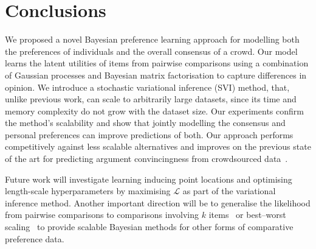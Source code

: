 \section{Conclusions}\label{sec:conclusion}

We proposed a novel Bayesian preference learning approach 
for modelling both the preferences of individuals 
and the overall consensus of a crowd. 
Our model learns the latent utilities of items from pairwise comparisons 
using a combination of Gaussian processes and Bayesian matrix factorisation 
to capture differences in  opinion.
We introduce a stochastic variational inference (SVI) method, that, 
unlike previous work, can scale to arbitrarily large datasets,
since its time and memory complexity do not grow with the dataset size.
Our experiments confirm the method's scalability and
 show that jointly modelling the consensus and personal
preferences can improve predictions of both.
Our approach performs competitively
against less scalable alternatives
and improves on 
the previous state of the art
for predicting argument convincingness from crowdsourced data~\citep{simpson2018finding}.

Future work will investigate learning inducing point locations and
optimising length-scale hyperparameters by maximising $\mathcal L$ as part of the variational inference method.
Another important direction will be to generalise the likelihood from pairwise comparisons
to comparisons involving $k$ items~\citep{pan2018stagewise}
or best--worst scaling~\citep{kiritchenko2017best}
to provide scalable Bayesian methods for other forms of comparative preference data.
